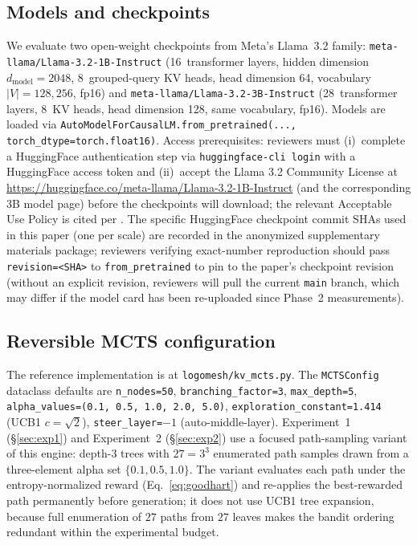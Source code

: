 \documentclass{article}
\begin{document}
\subsection{Models and checkpoints}
We evaluate two open-weight checkpoints from Meta's Llama~3.2 family: \texttt{meta-llama/Llama-3.2-1B-Instruct} (16~transformer layers, hidden dimension $d_{\text{model}} = 2048$, 8~grouped-query KV heads, head dimension 64, vocabulary $|V| = 128{,}256$, fp16) and \texttt{meta-llama/Llama-3.2-3B-Instruct} (28~transformer layers, 8~KV heads, head dimension 128, same vocabulary, fp16). Models are loaded via \texttt{AutoModelForCausalLM.from\_pretrained(..., torch\_dtype=torch.float16)}. Access prerequisites: reviewers must (i)~complete a HuggingFace authentication step via \texttt{huggingface-cli login} with a HuggingFace access token and (ii)~accept the Llama 3.2 Community License at \url{https://huggingface.co/meta-llama/Llama-3.2-1B-Instruct} (and the corresponding 3B model page) before the checkpoints will download; the relevant Acceptable Use Policy is cited per \cite{meta2024llama3_2_aup}. The specific HuggingFace checkpoint commit SHAs used in this paper (one per scale) are recorded in the anonymized supplementary materials package; reviewers verifying exact-number reproduction should pass \texttt{revision=<SHA>} to \texttt{from\_pretrained} to pin to the paper's checkpoint revision (without an explicit revision, reviewers will pull the current \texttt{main} branch, which may differ if the model card has been re-uploaded since Phase~2 measurements).

\subsection{Reversible MCTS configuration}
The reference implementation is at \texttt{logomesh/kv\_mcts.py}. The \texttt{MCTSConfig} dataclass defaults are \texttt{n\_nodes=50}, \texttt{branching\_factor=3}, \texttt{max\_depth=5}, \texttt{alpha\_values=(0.1, 0.5, 1.0, 2.0, 5.0)}, \texttt{exploration\_constant=1.414} (UCB1 $c = \sqrt{2}$), \texttt{steer\_layer=$-1$} (auto-middle-layer). Experiment~1 (§\ref{sec:exp1}) and Experiment~2 (§\ref{sec:exp2}) use a focused path-sampling variant of this engine: depth-$3$ trees with $27 = 3^3$ enumerated path samples drawn from a three-element alpha set $\{0.1, 0.5, 1.0\}$. The variant evaluates each path under the entropy-normalized reward (Eq.~\ref{eq:goodhart}) and re-applies the best-rewarded path permanently before generation; it does not use UCB1 tree expansion, because full enumeration of $27$ paths from $27$ leaves makes the bandit ordering redundant within the experimental budget.
\end{document}
